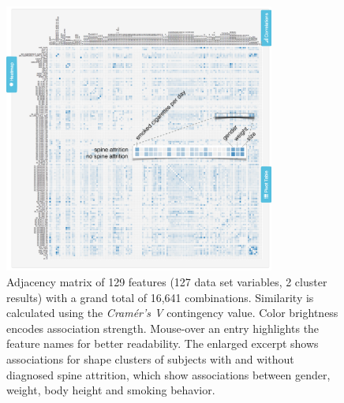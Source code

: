 \documentclass[journal]{style/vgtc} 			          %
\begin{document}
\begin{figure}[htb]
 \centering
 \includegraphics[width=3.5in]{figures/similarity_matrix}
 \caption{Adjacency matrix of 129 features (127 data set variables, 2 cluster results) with a grand total of 16,641 combinations.
 Similarity is calculated using the \emph{Cram\'{e}r's V} contingency value.
 Color brightness encodes association strength.
 Mouse-over an entry highlights the feature names for better readability.
 The enlarged excerpt shows associations for shape clusters of subjects with and without diagnosed spine attrition, which show associations between gender, weight, body height and smoking behavior.
 }
 \label{fig:similarity}
\end{figure}

\end{document}
